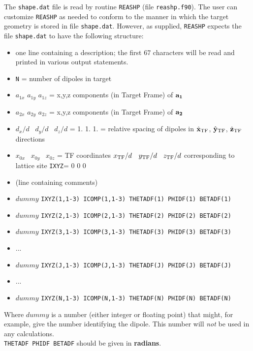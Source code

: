 	The {\tt shape.dat}
	file is read by routine {\tt REASHP} (file {\tt reashp.f90}).
	The user can customize {\tt REASHP} as needed to conform to the
	manner in which the target geometry is stored in file {\tt shape.dat}.
	However, as supplied, {\tt REASHP} expects the file {\tt shape.dat}
	to have the following structure:
	\begin{itemize}
	\item one line containing a description; the first 67 characters will
		be read and printed in various output statements.
	\item {\tt N} = number of dipoles in target
	\item $a_{1x}$ $a_{1y}$ $a_{1z}$ = x,y,z components (in Target Frame) 
	of $\bf{a}_1$
	\item $a_{2x}$ $a_{2y}$ $a_{2z}$ = x,y,z components (in Target Frame) 
	of $\bf{a}_2$
        \item $d_x/d$ ~$d_y/d$ ~$d_z/d$ = 1. 1. 1. = relative spacing of
              dipoles in $\hat{\bf x}_{\rm TF}$, $\hat{\bf y}_{\rm TF}$, $\hat{\bf z}_{\rm TF}$ directions
	\item $x_{0x}$~ $x_{0y}$~ $x_{0z}$ = TF coordinates
              $x_{\rm TF}/d$~ $y_{\rm TF}/d$~ $z_{\rm TF}/d$ corresponding to
	      lattice site {\tt IXYZ}= 0 0 0
	\item (line containing comments)
	\item {\footnotesize
	      $dummy$ {\tt IXYZ(1,1-3) 
		ICOMP(1,1-3)
	        THETADF(1) PHIDF(1) BETADF(1)}}
	\item {\footnotesize
	      $dummy$ {\tt IXYZ(2,1-3) 
		ICOMP(2,1-3)
	        THETADF(2) PHIDF(2) BETADF(2)}}
	\item {\footnotesize
              $dummy$ {\tt IXYZ(3,1-3)
		ICOMP(3,1-3)
                THETADF(3) PHIDF(3) BETADF(3)}}
	\item ...
	\item {\footnotesize
              $dummy$ {\tt IXYZ(J,1-3)
		ICOMP(J,1-3)
                THETADF(J) PHIDF(J) BETADF(J)}}
	\item ...
	\item {\footnotesize
              $dummy$ {\tt IXYZ(N,1-3) 
		ICOMP(N,1-3)
                THETADF(N) PHIDF(N) BETADF(N)}}
	\end{itemize}
	Where $dummy$ is a number (either integer or floating point) that
        might, for example, give the number identifying the dipole.  This
        number will {\it not} be used in any calculations.\\
	{\tt THETADF PHIDF BETADF} should be given in {\bf radians}.\\

